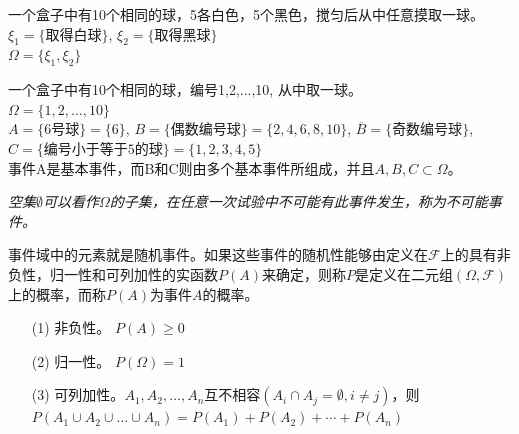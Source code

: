 \begin{frame}
\begin{example}
	一个盒子中有10个相同的球，5各白色，5个黑色，搅匀后从中任意摸取一球。\\
	$\xi_1=\{\text{取得白球} \}$, $\xi_2=\{\text{取得黑球} \}$\\
	$\Omega=\{\xi_1,\xi_2\}$
\end{example}
\begin{example}
	一个盒子中有10个相同的球，编号1,2,...,10, 从中取一球。\\
	$\Omega=\{1,2,\dots,10\}$\\
	$A=\{\text{6号球} \}=\{6\}$, $B=\{\text{偶数编号球} \}=\{2,4,6,8,10\}$, $\overline{B}=\{\text{奇数编号球}\}$,$C=\{\text{编号小于等于5的球} \}=\{1,2,3,4,5\}$\\
	事件A是基本事件，而B和C则由多个基本事件所组成，并且$A,B,C\subset\Omega$。
\end{example}
\textit{空集$\emptyset$可以看作$\Omega$的子集，在任意一次试验中不可能有此事件发生，称为不可能事件。}
\end{frame}

\begin{frame}
  事件域中的元素就是随机事件。如果这些事件的随机性能够由定义在$\mathcal{F}$上的具有非负性，归一性和可列加性的实函数$P(A)$来确定，则称$P$是定义在二元组$(\Omega,\mathcal{F})$上的概率，而称$P(A)$为事件$A$的概率。
  \begin{enumerate}
  	\item[(1)] 非负性。 $P(A)\ge 0$
  	\item[(2)] 归一性。 $P(\Omega)=1$
    \item[(3)] 可列加性。$A_1,A_2,...,A_n$互不相容$(A_i\cap A_j=\emptyset,i\ne j)$，则$P(A_1\cup A_2\cup\dots\cup A_n) = P(A_1)+P(A_2)+\cdots+P(A_n)$
  \end{enumerate}
\end{frame}

